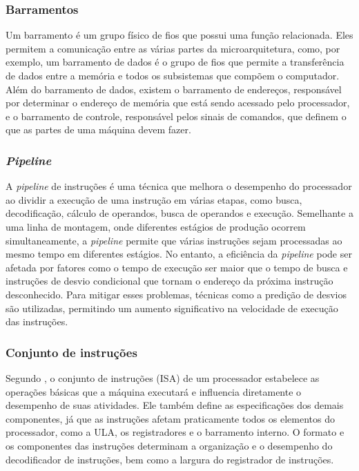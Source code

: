 \documentclass[
	12pt,				%
	openright,			%
	oneside,			%
	a4paper,			%
	english,			%
	french,				%
	spanish,			%
	brazil,				%
	]{abntex2}
\begin{document}
\subsubsection{Barramentos}
Um barramento é um grupo físico de fios que possui uma função relacionada. Eles permitem a comunicação entre as várias partes da microarquitetura, como, por exemplo, um barramento de dados é o grupo de fios que permite a transferência de dados entre a memória e todos os subsistemas que compõem o computador.\cite[p.11-12]{catsoulis_designing_2002}
Além do barramento de dados, existem o barramento de endereços, responsável por determinar o endereço de memória que está sendo acessado pelo processador, e o barramento de controle, responsável pelos sinais de comandos, que definem o que as partes de uma máquina devem fazer.

\subsubsection{\textit{Pipeline}}
A \textit{pipeline} de instruções é uma técnica que melhora o desempenho do processador ao dividir a execução de uma instrução em várias etapas, como busca, decodificação, cálculo de operandos, busca de operandos e execução. Semelhante a uma linha de montagem, onde diferentes estágios de produção ocorrem simultaneamente, a  \textit{pipeline} permite que várias instruções sejam processadas ao mesmo tempo em diferentes estágios. No entanto, a eficiência da \textit{pipeline} pode ser afetada por fatores como o tempo de execução ser maior que o tempo de busca e instruções de desvio condicional que tornam o endereço da próxima instrução desconhecido. Para mitigar esses problemas, técnicas como a predição de desvios são utilizadas, permitindo um aumento significativo na velocidade de execução das instruções. \cite[p.47-51]{stallings_reduced_1988}

\subsubsection{Conjunto de instruções}
Segundo , o conjunto de instruções (ISA) de um processador estabelece as operações básicas que a máquina executará e influencia diretamente o desempenho de suas atividades. Ele também define as especificações dos demais componentes, já que as instruções afetam praticamente todos os elementos do processador, como a ULA, os registradores e o barramento interno. O formato e os componentes das instruções determinam a organização e o desempenho do decodificador de instruções, bem como a largura do registrador de instruções.
\end{document}
